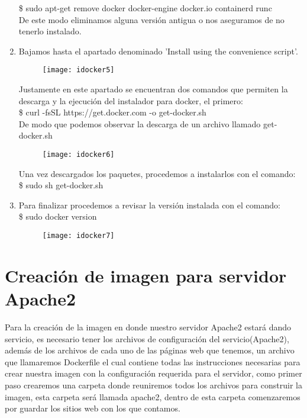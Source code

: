 \documentclass[10pt,letterpaper]{article}
\begin{document}
\begin{enumerate}
\$ sudo apt-get remove docker docker-engine docker.io containerd runc \\

De este modo eliminamos alguna versi\'on antigua o nos aseguramos de no tenerlo instalado. \\

\item Bajamos hasta el apartado denominado 'Install using the convenience script'.

\begin{figure}[h]
\texttt{[image: idocker5]}
\centering
\end{figure} 

Justamente en este apartado se encuentran dos comandos que permiten la descarga y la ejecuci\'on del instalador para docker, el primero: \\

\$ curl -fsSL https://get.docker.com -o get-docker.sh \\ 

De modo que podemos observar la descarga de un archivo llamado get-docker.sh \\

\begin{figure}[h]
\texttt{[image: idocker6]}
\centering
\end{figure} 

\newpage
Una vez descargados los paquetes, procedemos a instalarlos con el comando: \\ 

\$ sudo sh get-docker.sh

\item Para finalizar procedemos a revisar la versi\'on instalada con el comando: \\

\$ sudo docker version

\begin{figure}[h]
\texttt{[image: idocker7]}
\centering
\end{figure}
\end{enumerate}

\newpage
\section{Creaci\'on de imagen para servidor Apache2}
Para la creaci\'on de la imagen en donde nuestro servidor Apache2 estar\'a dando servicio, es necesario tener los archivos de configuraci\'on del servicio(Apache2), adem\'as de los archivos de cada uno de las p\'aginas web que tenemos, un archivo que llamaremos Dockerfile el cual contiene todas las instrucciones necesarias para crear nuestra imagen con la configuraci\'on requerida para el servidor, como primer paso crearemos una carpeta donde reuniremos todos los archivos para construir la imagen, esta carpeta ser\'a llamada apache2, dentro de esta carpeta comenzaremos por guardar los sitios web con los que contamos.
\end{document}
